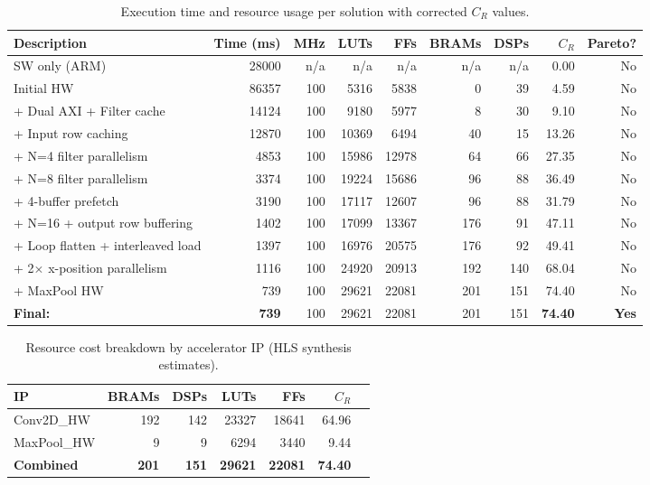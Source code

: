 \documentclass[11pt,a4paper]{article}
\begin{document}
\begin{table}[H]
\centering
\small
\setlength{\tabcolsep}{5pt}
\begin{tabular}{p{5.8cm}rrrrrrrr}
\toprule
\textbf{Description} & \textbf{Time (ms)} & \textbf{MHz} & \textbf{LUTs} & \textbf{FFs} & \textbf{BRAMs} & \textbf{DSPs} & \textbf{$C_R$} & \textbf{Pareto?} \\
\midrule
SW only (ARM)                       & 28000 & n/a & n/a   & n/a   & n/a & n/a & 0.00  & No  \\
Initial HW                          & 86357 & 100 & 5316  & 5838  & 0   & 39  & 4.59  & No  \\
+ Dual AXI + Filter cache           & 14124 & 100 & 9180  & 5977  & 8   & 30  & 9.10  & No  \\
+ Input row caching                 & 12870 & 100 & 10369 & 6494  & 40  & 15  & 13.26 & No  \\
+ N=4 filter parallelism            & 4853  & 100 & 15986 & 12978 & 64  & 66  & 27.35 & No  \\
+ N=8 filter parallelism            & 3374  & 100 & 19224 & 15686 & 96  & 88  & 36.49 & No  \\
+ 4-buffer prefetch                 & 3190  & 100 & 17117 & 12607 & 96  & 88  & 31.79 & No  \\
+ N=16 + output row buffering       & 1402  & 100 & 17099 & 13367 & 176 & 91  & 47.11 & No  \\
+ Loop flatten + interleaved load   & 1397  & 100 & 16976 & 20575 & 176 & 92  & 49.41 & No  \\
+ 2$\times$ x-position parallelism  & 1116  & 100 & 24920 & 20913 & 192 & 140 & 68.04 & No  \\
+ MaxPool HW              & 739   & 100 & 29621 & 22081 & 201 & 151 & 74.40 & No  \\
\midrule
\textbf{Final:} & \textbf{739} & 100 & 29621 & 22081 & 201 & 151 & \textbf{74.40} & \textbf{Yes} \\
\bottomrule
\end{tabular}
\caption{Execution time and resource usage per solution with corrected $C_R$ values.}
\end{table}

\begin{table}[H]
\centering
\begin{tabular}{lrrrrrr}
\toprule
\textbf{IP} & \textbf{BRAMs} & \textbf{DSPs} & \textbf{LUTs} & \textbf{FFs} & \textbf{$C_R$} \\
\midrule
Conv2D\_HW  & 192 & 142 & 23327 & 18641 & 64.96 \\
MaxPool\_HW & 9   & 9   & 6294  & 3440  & 9.44  \\
\midrule
\textbf{Combined} & \textbf{201} & \textbf{151} & \textbf{29621} & \textbf{22081} & \textbf{74.40} \\
\bottomrule
\end{tabular}
\caption{Resource cost breakdown by accelerator IP (HLS synthesis estimates).}
\end{table}
\end{document}

